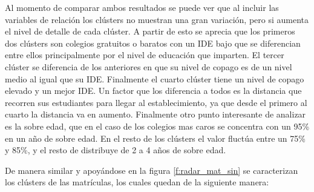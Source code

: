 Al momento de comparar ambos resultados se puede ver que al incluir las variables de relación los clústers no muestran una gran variación, pero si aumenta el nivel de detalle de cada clúster. A partir de esto se aprecia que los primeros dos clústers son colegios gratuitos o baratos con un IDE bajo que se diferencian entre ellos principalmente por el nivel de educación que imparten. El tercer clúster se diferencia de los anteriores en que su nivel de copago es de un nivel medio al igual que su IDE. Finalmente el cuarto clúster tiene un nivel de copago elevado y un mejor IDE. Un factor que los diferencia a todos es la distancia que recorren sus estudiantes para llegar al establecimiento, ya que desde el primero al cuarto la distancia va en aumento. Finalmente otro punto interesante de analizar es la sobre edad, que en el caso de los colegios mas caros se concentra con un 95\% en un año de sobre edad. En el resto de los clústers el valor fluctúa entre un 75\% y 85\%, y el resto de distribuye de 2 a 4 años de sobre edad.

De manera similar y apoyándose en la figura \ref{f:radar_mat_sin} se caracterizan los clústers de las matrículas, los cuales quedan de la siguiente manera:

